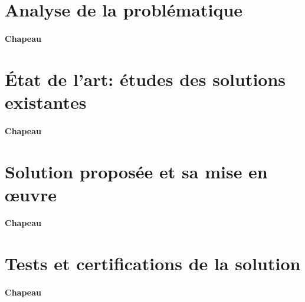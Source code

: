 \section{Analyse de la problématique}
\label{sec:technique_1_analyse_de_la_problematique}

\paragraph{Chapeau}


\section{État de l’art: études des solutions existantes}
\label{sec:technique_1_etat_de_art_etudes_des_solutions_existantes}

\paragraph{Chapeau}


\section{Solution proposée et sa mise en œuvre}
\label{sec:technique_1_solution_proposee_et_sa_mise_en_œuvre}

\paragraph{Chapeau}


\section{Tests et certifications de la solution}
\label{sec:technique_1_tests_et_certifications_de_la_solution}

\paragraph{Chapeau}